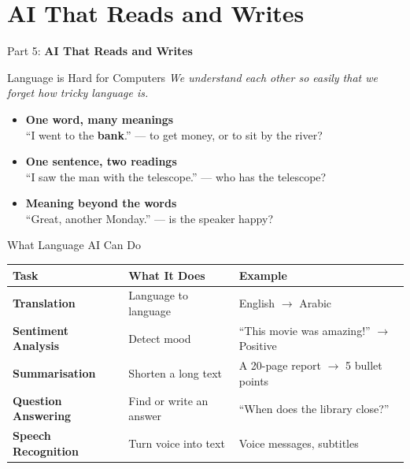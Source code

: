 \section{AI That Reads and Writes}
\begin{frame}{}
    \LARGE Part 5: \textbf{AI That Reads and Writes}
\end{frame}

\begin{frame}{Language is Hard for Computers}
    \textit{We understand each other so easily that we forget how tricky language is.}

    \vspace{0.8em}
    \begin{itemize}
        \setlength\itemsep{0.9em}
        \item \textbf{One word, many meanings}\\
        ``I went to the \textbf{bank}.'' --- to get money, or to sit by the river?
        \item \textbf{One sentence, two readings}\\
        ``I saw the man with the telescope.'' --- who has the telescope?
        \item \textbf{Meaning beyond the words}\\
        ``Great, another Monday.'' --- is the speaker happy?
    \end{itemize}

    \vspace{0.8em}
\end{frame}

\begin{frame}{What Language AI Can Do}
    \centering
    \renewcommand{\arraystretch}{1.5}
    \begin{tabular}{@{} >{\raggedright\arraybackslash}p{}
                        >{\raggedright\arraybackslash}p{}
                        >{\raggedright\arraybackslash}p{} @{}}
        \toprule
        \textbf{Task} & \textbf{What It Does} & \textbf{Example} \\
        \midrule
        \textbf{Translation} & Language to language & English $\rightarrow$ Arabic \\
        \textbf{Sentiment Analysis} & Detect mood & ``This movie was amazing!'' $\rightarrow$ Positive \\
        \textbf{Summarisation} & Shorten a long text & A 20-page report $\rightarrow$ 5 bullet points \\
        \textbf{Question Answering} & Find or write an answer & ``When does the library close?'' \\
        \textbf{Speech Recognition} & Turn voice into text & Voice messages, subtitles \\
        \bottomrule
    \end{tabular}
\end{frame}


